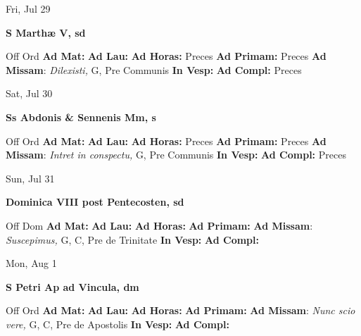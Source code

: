 \documentclass[10pt]{article}
\begin{document}
\begin{minipage}{3.5in}
\vspace{2em}\begin{center}
Fri, Jul 29
\end{center}\textbf{ \large S Marthæ V, \textnormal{\normalsize sd}}
\begin{justify}
Off Ord
\textbf{Ad Mat: }
\textbf{Ad Lau: }
\textbf{Ad Horas: }Preces
\textbf{Ad Primam: }Preces
\textbf{Ad Missam}: \textit{Dilexisti,} G, Pre Communis
\textbf{In Vesp: }
\textbf{Ad Compl: }Preces\end{justify}
\end{minipage}



\begin{minipage}{3.5in}
\vspace{2em}\begin{center}
Sat, Jul 30
\end{center}\textbf{ \large Ss Abdonis \& Sennenis Mm, \textnormal{\normalsize s}}
\begin{justify}
Off Ord
\textbf{Ad Mat: }
\textbf{Ad Lau: }
\textbf{Ad Horas: }Preces
\textbf{Ad Primam: }Preces
\textbf{Ad Missam}: \textit{Intret in conspectu,} G, Pre Communis
\textbf{In Vesp: }
\textbf{Ad Compl: }Preces\end{justify}
\end{minipage}



\begin{minipage}{3.5in}
\vspace{2em}\begin{center}
Sun, Jul 31
\end{center}\textbf{ \large Dominica VIII post Pentecosten, \textnormal{\normalsize sd}}
\begin{justify}
Off Dom
\textbf{Ad Mat: }
\textbf{Ad Lau: }
\textbf{Ad Horas: }
\textbf{Ad Primam: }
\textbf{Ad Missam}: \textit{Suscepimus,} G, C, Pre de Trinitate
\textbf{In Vesp: }
\textbf{Ad Compl: }\end{justify}
\end{minipage}



\begin{minipage}{3.5in}
\vspace{2em}\begin{center}
Mon, Aug 1
\end{center}\textbf{ \large S Petri Ap ad Vincula, \textnormal{\normalsize dm}}
\begin{justify}
Off Ord
\textbf{Ad Mat: }
\textbf{Ad Lau: }
\textbf{Ad Horas: }
\textbf{Ad Primam: }
\textbf{Ad Missam}: \textit{Nunc scio vere,} G, C, Pre de Apostolis
\textbf{In Vesp: }
\textbf{Ad Compl: }\end{justify}
\end{minipage}
\end{document}
